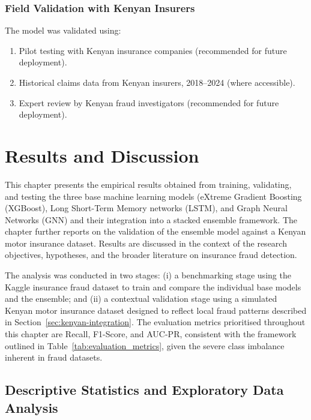 \documentclass[12pt,a4paper,oneside]{report}
\numberwithin{equation}{chapter}
\begin{document}
\subsection{Field Validation with Kenyan Insurers}
\label{sec:field-validation}

The model was validated using:
\begin{enumerate}
    \item Pilot testing with Kenyan insurance companies (recommended for future deployment).
    \item Historical claims data from Kenyan insurers, 2018--2024 (where accessible).
    \item Expert review by Kenyan fraud investigators (recommended for future deployment).
\end{enumerate}

\newpage

\chapter{Results and Discussion}

This chapter presents the empirical results obtained from training, validating, and testing the
three base machine learning models (eXtreme Gradient Boosting (XGBoost), Long Short-Term Memory
networks (LSTM), and Graph Neural Networks (GNN) and their integration into a stacked ensemble
framework. The chapter further reports on the validation of the ensemble model against a Kenyan
motor insurance dataset. Results are discussed in the context of the research objectives,
hypotheses, and the broader literature on insurance fraud detection.

The analysis was conducted in two stages: (i) a benchmarking stage using the Kaggle insurance
fraud dataset to train and compare the individual base models and the ensemble; and (ii) a
contextual validation stage using a simulated Kenyan motor insurance dataset designed to reflect
local fraud patterns described in Section~\ref{sec:kenyan-integration}. The evaluation metrics
prioritised throughout this chapter are Recall, F1-Score, and AUC-PR, consistent with the
framework outlined in Table~\ref{tab:evaluation_metrics}, given the severe class imbalance
inherent in fraud datasets.

\section{Descriptive Statistics and Exploratory Data Analysis}
\end{document}
